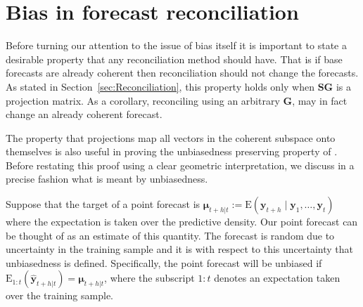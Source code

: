 \documentclass[12pt]{article}
\def\E{\text{E}}
\theoremstyle{definition}
\begin{document}
%


\section{Bias in forecast reconciliation}\label{sec:BiasInRecon}

Before turning our attention to the issue of bias itself it is important to state a desirable property that any reconciliation method should have. That is if base forecasts are already coherent then reconciliation should not change the forecasts. As stated in Section~\ref{sec:Reconciliation}, this property holds only when $\bm{S}\bm{G}$ is a projection matrix. As a corollary, reconciling using an arbitrary $\bm{G}$, may in fact change an already coherent forecast.

The property that projections map all vectors in the coherent subspace onto themselves is also useful in proving the unbiasedness preserving property of \citet{WicEtAl2019}. Before restating this proof using a clear geometric interpretation, we discuss in a precise fashion what is meant by unbiasedness.

Suppose that the target of a point forecast is $\bm{\mu}_{t+h|t}:=\E(\bm{y}_{t+h}\mid\bm{y}_{1},\dots,\bm{y}_{t})$ where the expectation is taken over the predictive density. Our point forecast can be thought of as an estimate of this quantity. The forecast is random due to uncertainty in the training sample and it is with respect to this uncertainty that unbiasedness is defined. Specifically, the point forecast will be unbiased if $\E_{1:t}(\hat{\bm{y}}_{t+h|t})=\bm{\mu}_{t+h|t}$, where the subscript $1:t$ denotes an expectation taken over the training sample.
\end{document}
